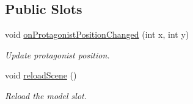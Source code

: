 \subsection*{Public Slots}
\begin{DoxyCompactItemize}
\item 
void \hyperlink{classWorldGraphicsView_afe30c74f794ae1b385ca3a89cb9ede25}{on\+Protagonist\+Position\+Changed} (int x, int y)
\begin{DoxyCompactList}\small\item\em Update protagonist position. \end{DoxyCompactList}\item 
void \hyperlink{classWorldGraphicsView_a8bdead6606060dc49a5faa5464d94c8d}{reload\+Scene} ()
\begin{DoxyCompactList}\small\item\em Reload the model slot. \end{DoxyCompactList}\end{DoxyCompactItemize}
